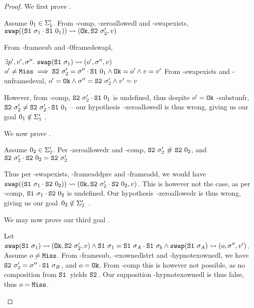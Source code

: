 \begin{proof}
We first prove .

\begin{hypvlist}
	 Assume $0_1\in \Sigma_1'$.
	 From \hyp{comp}, \hyp{zeroallowedl} and \hyp{swapexists}, $\texttt{swap}((\texttt{S1}~\sigma_1\cdot\texttt{S1}~0_1))\rightsquigarrow(\texttt{Ok},\texttt{S2}~\sigma_2',v)$ 
\end{hypvlist}

From \hyp{framesub} and \hyp{0framedswapl},
\begin{hypvlist}
	 $\exists p',v',\sigma''.~\texttt{swap}(\texttt{S1}~\sigma_1)\rightsquigarrow(o',\sigma'',v)$
	 $o'\neq\texttt{Miss}\implies \texttt{S2}~\sigma_2'=\sigma''\cdot\texttt{S1}~0_1 \land \texttt{Ok}=o' \land v=v'$
	 From \hyp{swapexists} and \hyp{unframedeval}, $o'=\texttt{Ok} \land \sigma''=\texttt{S2}~\sigma_2' \land v'=v$
\end{hypvlist}

However, from \hyp{comp}, $\texttt{S2}~\sigma_2'\cdot\texttt{S1}~0_1$ is undefined, thus despite $o'=\texttt{Ok}$ \hyp{substunfr}, $\texttt{S2}~\sigma_2'\neq\texttt{S2}~\sigma_2'\cdot\texttt{S1}~0_1$ -- our hypothesis~\hyp{zeroallowedl} is thus wrong, giving us our goal $0_1\notin \Sigma_1'$ .


We now prove .

\begin{hypvlist}
	 Assume $0_2\in \Sigma_2'$.
	 Per \hyp{zeroallowedr} and \hyp{comp}, $\texttt{S2}~\sigma_2'~\#~\texttt{S2}~0_2$, and $\texttt{S2}~\sigma_2'\cdot\texttt{S2}~0_2=\texttt{S2}~\sigma_2'$
\end{hypvlist}

Thus per \hyp{swapexists}, \hyp{frameaddpre} and \hyp{frameadd}, we would have $\texttt{swap}((\texttt{S1}~\sigma_1\cdot\texttt{S2}~0_2))\rightsquigarrow(\texttt{Ok},\texttt{S2}~\sigma_2'\cdot\texttt{S2}~0_2,v)$. This is however not the case, as per \hyp{comp}, $\texttt{S1}~\sigma_1\cdot\texttt{S2}~0_2$ is undefined. Our hypothesis~\hyp{zeroallowedr} is thus wrong, giving us our goal~$0_2\notin\Sigma_2'$~.



We may now prove our third goal .

\begin{hypvlist}
	 Let $\texttt{swap}(\texttt{S1}~\sigma_1)\rightsquigarrow(\texttt{Ok},\texttt{S2}~\sigma_2',v) \land \texttt{S1}~\sigma_1=\texttt{S1}~\sigma_A\cdot\texttt{S1}~\sigma_b \land \texttt{swap}(\texttt{S1}~\sigma_A)\rightsquigarrow(o,\sigma'',v')$.
	 Assume $o\neq\texttt{Miss}$.
	 From \hyp{framesub}, \hyp{exownedlstrt} and \hyp{hypnotexownedl}, we have $\texttt{S2}~\sigma_2'=\sigma''\cdot\texttt{S1}~\sigma_B$, and $o=\texttt{Ok}$. From \hyp{comp} this is however not possible, as no composition from $\texttt{S1}~\!$ yields $\texttt{S2}~\!$. Our supposition \hyp{hypnotexownedl} is thus false, thus $o=\texttt{Miss}$.
\end{hypvlist}



\end{proof}
